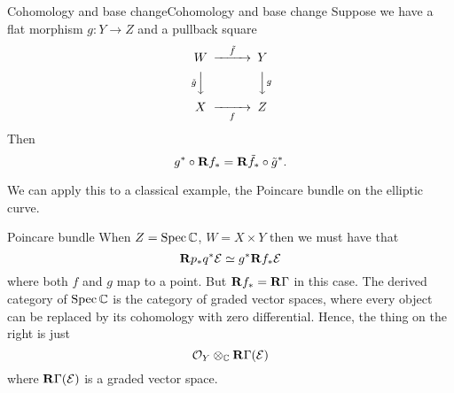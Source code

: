 \begin{theorem}{Cohomology and base change}{Cohomology and base change}
    Suppose we have a flat morphism $g:Y\to Z$ and a pullback square
    \begin{equation*}
        \begin{CD}
            W @>\tilde f>> Y \\
              @V\tilde gVV @VVgV \\
            X @>>f> Z
        \end{CD}
    \end{equation*}
    Then
    \begin{equation*}
        g^*\circ\mathbf{R} f_*=\mathbf{R}\tilde f_*\circ\tilde g^*.
    \end{equation*}
\end{theorem}

We can apply this to a classical example, the Poincare bundle on the elliptic curve.
\begin{example}{Poincare bundle}{}
When $Z=\operatorname{Spec}\mathbb{C}$, $W=X\times Y$ then we must have that
\begin{equation*}
    \mathbf{R} p_*q^*\mathcal{E} \simeq g^*\mathbf{R} f_*\mathcal{E}
\end{equation*}
where both $f$ and $g$ map to a point. But $\mathbf{R} f_*=\operatorname{\mathbf{R}\Gamma}$ in this case. The derived category of $\operatorname{Spec}\mathbb{C}$ is the category of graded vector spaces, where every object can be replaced by its cohomology with zero differential. Hence, the thing on the right is just
\begin{equation*}
    \mathcal{O}_Y\otimes_{\mathbb{C}}\operatorname{\mathbf{R}\Gamma}(\mathcal{E})
\end{equation*}
where $\operatorname{\mathbf{R}\Gamma}(\mathcal{E})$ is a graded vector space.

\end{example}

